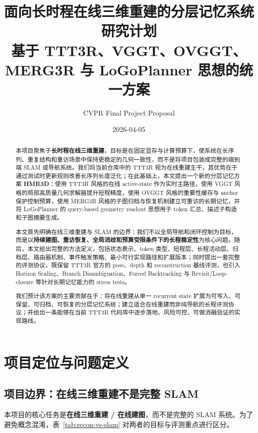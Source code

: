 \documentclass[12pt]{article}
\title{
面向长时程在线三维重建的分层记忆系统研究计划\\
\large 基于 TTT3R、VGGT、OVGGT、MERG3R 与 LoGoPlanner 思想的统一方案
}
\author{CVPR Final Project Proposal}
\date{2026-04-05}
\newcommand{\method}{\textbf{HMR3D}}
\begin{document}
\maketitle

\begin{abstract}
本项目聚焦于\textbf{长时程在线三维重建}，目标是在固定显存与计算预算下，使系统在长序列、重复结构和重访场景中保持更稳定的几何一致性，而不是将项目包装成完整的端到端 SLAM 或导航系统。我们将当前仓库中的 TTT3R 视为在线重建主干，其优势在于通过测试时更新规则改善长序列长度泛化；在此基础上，本文提出一个新的分层记忆方案 \method{}：使用 TTT3R 风格的在线 active-state 作为实时主路径，使用 VGGT 风格的局部高质量几何求解器提升短程精度，使用 OVGGT 风格的重要性缓存与 anchor 保护控制预算，使用 MERG3R 风格的子图归档与恢复机制建立可重访的长期记忆，并将 LoGoPlanner 的 query-based geometry readout 思想用于 token 汇总、描述子构造和子图摘要生成。

本文首先明确在线三维重建与 SLAM 的边界：我们不以全局导航和闭环控制为目标，而是以\textbf{持续建图、重访恢复、全局消歧和预算受限条件下的长程稳定性}为核心问题。随后，本文给出完整的方法定义，包括状态表示、token 类型、短程层、长程活动层、归档层、路由器机制、事件触发策略、最小可行实现路径和扩展版本；同时提出一套完整的评测协议，既保留 TTT3R 官方的 pose、depth 和 reconstruction 基线评测，也引入 Horizon Scaling、Branch Disambiguation、Forced Backtracking 与 Revisit/Loop-closure 等针对长期记忆能力的 stress tests。

我们预计该方案的主要贡献在于：将在线重建从单一 recurrent state 扩展为可写入、可保留、可归档、可恢复的分层记忆系统；建立适合在线重建而非纯导航的长程评测协议；并给出一条能够在当前 TTT3R 代码库中逐步落地、风险可控、可做消融验证的实现路线。
\end{abstract}

\tableofcontents
\newpage

\section{项目定位与问题定义}

\subsection{项目边界：在线三维重建不是完整 SLAM}

本项目的核心任务是\textbf{在线三维重建 / 在线建图}，而不是完整的 SLAM 系统。为了避免概念混淆，表~\ref{tab:recon-vs-slam} 对两者的目标与评测重点进行区分。
\end{document}
